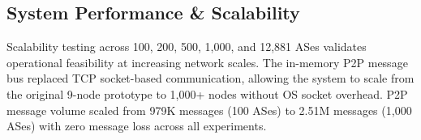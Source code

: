 \subsection{System Performance \& Scalability}
\label{subsec:performance_scalability}

Scalability testing across 100, 200, 500, 1{,}000, and 12{,}881 ASes validates operational feasibility at increasing network scales. The in-memory P2P message bus replaced TCP socket-based communication, allowing the system to scale from the original 9-node prototype to 1{,}000+ nodes without OS socket overhead. P2P message volume scaled from 979K messages (100 ASes) to 2.51M messages (1{,}000 ASes) with zero message loss across all experiments.


